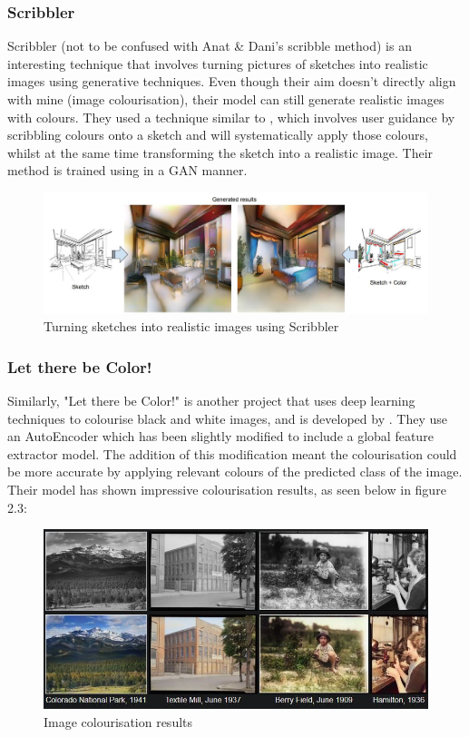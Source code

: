 \subsubsection*{Scribbler}
Scribbler (not to be confused with  Anat \& Dani's scribble method) is an interesting technique that involves turning pictures of sketches into realistic images using generative techniques\cite{sangkloy2016scribbler}. Even though their aim doesn't directly align with mine (image colourisation), their model can still generate realistic images with colours. They used a technique similar to \cite{Levin2004}, which involves user guidance by scribbling colours onto a sketch and will systematically apply those colours, whilst at the same time transforming the sketch into a realistic image. Their method is trained using in a GAN manner.
\begin{figure}[H]
    \centering
    \includegraphics[width=0.7\columnwidth]{sections/figures/scribbler.JPG}
    \caption{Turning sketches into realistic images using Scribbler}
    \label{fig:my_label}
\end{figure}


\subsubsection*{Let there be Color!}
Similarly, "Let there be Color!" is another project that uses deep learning techniques to colourise black and white images, and is developed by \cite{IizukaSIGGRAPH2016}. They use an AutoEncoder which has been slightly modified to include a global feature extractor model. The addition of this modification meant the colourisation could be more accurate by applying relevant colours of the predicted class of the image. Their model has shown impressive colourisation results, as seen below in figure 2.3:
\begin{figure}[H]
    \centering
    \includegraphics[width=0.7\columnwidth]{sections/figures/LTBC.JPG}
    \caption{Image colourisation results}
    \label{fig:my_label}
\end{figure}

